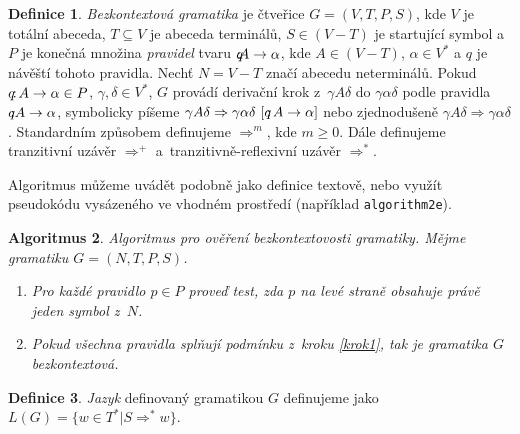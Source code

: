 \documentclass[czech,a4paper,twocolumn,11pt]{article}
\theoremstyle{definition}
\newtheorem{definice}{Definice}[section]
\theoremstyle{definition}
\newtheorem{algoritmus}[definice]{Algoritmus}
\theoremstyle{definition}
\begin{document}
\begin{definice} \hspace{0.0mm}
\label{definice1.1} \emph{Bezkontextová gramatika} je čtveřice $G=(V,T,P,S)$, kde $V$ je totální abeceda, $T \subseteq V$ je abeceda terminálů, $S \in (V-T)$ je startující symbol a~$P$ je konečná množina \emph{pravidel} tvaru $q\hspace{-2.5mm}:\hspace{-1.5mm} A \rightarrow \alpha$, kde $A \in (V-T)$, $\alpha \in V^*$ a $q$ je návěští tohoto pra\-vi\-dla. Nechť $N=V-T$ značí abecedu neterminálů. Pokud $q\hspace{-1.5mm}:\hspace{-0.5mm} A \rightarrow \alpha \in P$, $\gamma, \delta \in V^*$, $G$ provádí derivační krok z~$\gamma A \delta$ do $\gamma \alpha \delta$ podle pravidla $q\hspace{-2.0mm}:\hspace{-1.0mm} A \rightarrow \alpha$, symbolicky píšeme $\gamma A \delta \Rightarrow \gamma \alpha \delta\ [q \hspace{-2.0mm}:\hspace{-0.5mm}A \rightarrow \alpha]$ nebo zjednodušeně $\gamma A \delta \Rightarrow \gamma \alpha \delta$. Standardním způsobem definujeme $\Rightarrow^m$, kde $m \geq 0$. Dále definujeme tranzitivní uzávěr $\Rightarrow^+$ a~tranzitivně-reflexivní uzávěr $\Rightarrow^*$.
\end{definice}

Algoritmus můžeme uvádět podobně jako definice textově, nebo využít pseudokódu vysázeného ve vhodném prostředí (například \texttt{algorithm2e}).

\begin{algoritmus}
\emph{Algoritmus pro ověření bezkontextovosti gramatiky. Mějme gramatiku $G=(N,T,P,S)$.}
\begin{enumerate}
\item \label{krok1}\emph{Pro každé pravidlo $p \in P$ proveď test, zda $p$ na levé straně obsahuje právě jeden symbol z~$N$.}
\item \emph{Pokud všechna pravidla splňují podmínku z~kroku \ref{krok1}, tak je gramatika $G$ bezkontextová.}
\end{enumerate}
\end{algoritmus}

\begin{definice} \hspace{0.0mm} 
\emph{Jazyk} definovaný gramatikou $G$ definujeme jako $L(G)=\{ w \in T^*|S \Rightarrow^* w\}$.
\end{definice}
\end{document}
